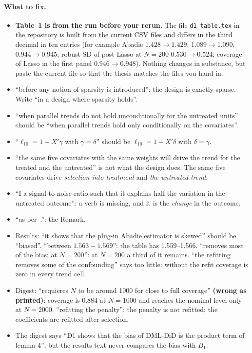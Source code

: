 \documentclass[11pt]{article}
\theoremstyle{plain}
\theoremstyle{remark}
\begin{document}
\paragraph{What to fix.}
\begin{itemize}
\item \textbf{Table~1 is from the run before your rerun.} The file
  \texttt{d1\_table.tex} in the repository is built from the current CSV files
  and differs in the third decimal in ten entries (for example Abadie
  $1.428\to1.429$, $1.089\to1.090$, $0.944\to0.945$; robust SD of post-Lasso at
  $N=200$ $0.530\to0.524$; coverage of Lasso in the first panel $0.946\to0.948$).
  Nothing changes in substance, but paste the current file so that the thesis
  matches the files you hand in.
\item ``before any notion of sparsity is introduced'': the design is exactly
  sparse. Write ``in a design where sparsity holds''.
\item ``when parallel trends do not hold unconditionally for the untreated
  units'' should be ``when parallel trends hold only conditionally on the
  covariates''.
\item ``$\ell_{10}=1+X'\gamma$ with $\gamma=\delta$'' should be
  $\ell_{10}=1+X'\delta$ with $\delta=\gamma$.
\item ``the same five covariates with the same weights will drive the trend for
  the treated and the untreated'' is not what the design does. The same five
  covariates drive \emph{selection into treatment} and \emph{the untreated
  trend}.
\item ``I a signal-to-noise-ratio such that it explains half the variation in
  the untreated outcome'': a verb is missing, and it is the \emph{change} in the
  outcome.
\item ``as per~.'': the Remark.
\item Results: ``it shows that the plug-in Abadie estimator is skewed'' should be
  ``biased''. ``between $1.563-1.569$'': the table has 1.559--1.566. ``removes
  most of the bias: at $N=200$'': at $N=200$ a third of it remains. ``the
  refitting removes some of the confounding'' says too little: without the refit
  coverage is zero in every trend cell.
\item Digest: ``requieres $N$ to be around 1000 for close to full coverage''
  \textbf{(wrong as printed)}: coverage is 0.884 at $N=1000$ and reaches the
  nominal level only at $N=2000$. ``refitting the penalty'': the penalty is not
  refitted; the coefficients are refitted after selection.
\item The digest says ``D1 shows that the bias of DML-DiD is the product term of
  lemma 4'', but the results text never compares the bias with $B_1$.
\end{itemize}
\end{document}
